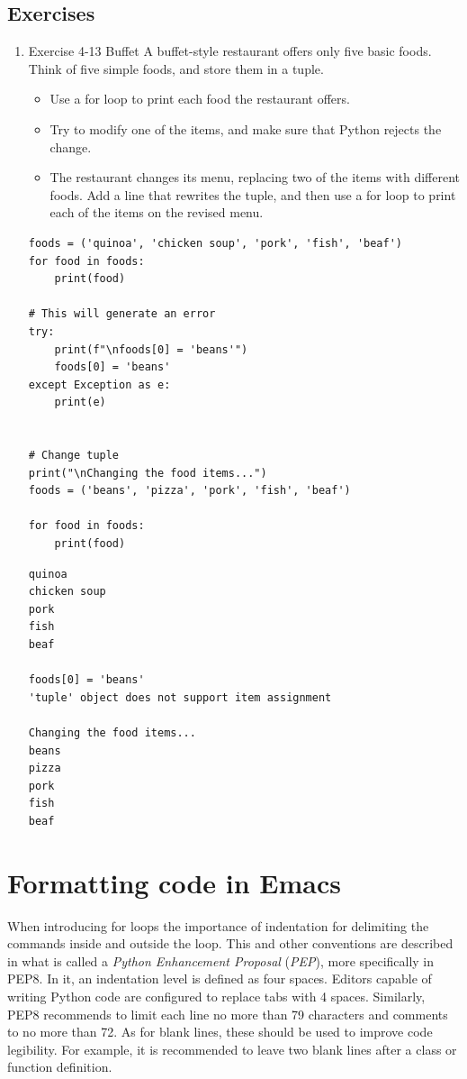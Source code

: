 \documentclass[10pt]{book}
\begin{document}
\subsection{Exercises}
\label{sec:org2d69d81}
\begin{enumerate}
\item Exercise 4-13 Buffet
\label{sec:orgfd813e4}
A buffet-style restaurant offers only five basic foods. Think of five simple foods, and store them in a tuple.

\begin{itemize}
\item Use a for loop to print each food the restaurant offers.
\item Try to modify one of the items, and make sure that Python rejects the change.
\item The restaurant changes its menu, replacing two of the items with different foods. Add a line that rewrites the tuple, and then use a for loop to print each of the items on the revised menu.
\end{itemize}
\begin{verbatim}
foods = ('quinoa', 'chicken soup', 'pork', 'fish', 'beaf')
for food in foods:
    print(food)

# This will generate an error
try:
    print(f"\nfoods[0] = 'beans'")
    foods[0] = 'beans'
except Exception as e:
    print(e)


# Change tuple
print("\nChanging the food items...")
foods = ('beans', 'pizza', 'pork', 'fish', 'beaf')

for food in foods:
    print(food)
\end{verbatim}

\label{orgbc75f40}
\begin{verbatim}
quinoa
chicken soup
pork
fish
beaf

foods[0] = 'beans'
'tuple' object does not support item assignment

Changing the food items...
beans
pizza
pork
fish
beaf
\end{verbatim}
\end{enumerate}
\section{Formatting code in Emacs}
\label{sec:orga2b60b5}
When introducing for loops the importance of indentation for delimiting the commands inside and outside the loop. This and other conventions are described in what is called a \emph{Python Enhancement Proposal} (\emph{PEP}), more specifically in PEP8. In it, an indentation level is defined as four spaces. Editors capable of writing Python code are configured to replace tabs with 4 spaces.  Similarly, PEP8 recommends to limit each line no more than 79 characters and comments to no more than 72. As for blank lines, these should be used to improve code legibility. For example, it is recommended to leave two blank lines after a class or function definition.
\end{document}
